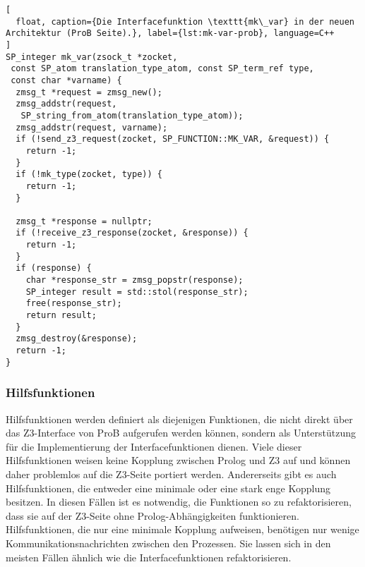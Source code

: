 \begin{lstlisting}[
  float, caption={Die Interfacefunktion \texttt{mk\_var} in der neuen Architektur (ProB Seite).}, label={lst:mk-var-prob}, language=C++
]
SP_integer mk_var(zsock_t *zocket,
 const SP_atom translation_type_atom, const SP_term_ref type,
 const char *varname) {
  zmsg_t *request = zmsg_new();
  zmsg_addstr(request,
   SP_string_from_atom(translation_type_atom));
  zmsg_addstr(request, varname);
  if (!send_z3_request(zocket, SP_FUNCTION::MK_VAR, &request)) {
    return -1;
  }
  if (!mk_type(zocket, type)) {
    return -1;
  }

  zmsg_t *response = nullptr;
  if (!receive_z3_response(zocket, &response)) {
    return -1;
  }
  if (response) {
    char *response_str = zmsg_popstr(response);
    SP_integer result = std::stol(response_str);
    free(response_str);
    return result;
  }
  zmsg_destroy(&response);
  return -1;
}
\end{lstlisting}


\subsubsection{Hilfsfunktionen}
\label{subsec:helper-functions}

Hilfsfunktionen werden definiert als diejenigen Funktionen, die nicht direkt über das Z3-Interface von ProB aufgerufen werden können,
sondern als Unterstützung für die Implementierung der Interfacefunktionen dienen.
Viele dieser Hilfsfunktionen weisen keine Kopplung zwischen Prolog und Z3 auf und können daher problemlos auf die Z3-Seite portiert werden.
Andererseits gibt es auch Hilfsfunktionen, die entweder eine minimale oder eine stark enge Kopplung besitzen.
In diesen Fällen ist es notwendig, die Funktionen so zu refaktorisieren, dass sie auf der Z3-Seite ohne Prolog-Abhängigkeiten funktionieren.
Hilfsfunktionen, die nur eine minimale Kopplung aufweisen, benötigen nur wenige Kommunikationsnachrichten zwischen den Prozessen.
Sie lassen sich in den meisten Fällen ähnlich wie die Interfacefunktionen refaktorisieren.


